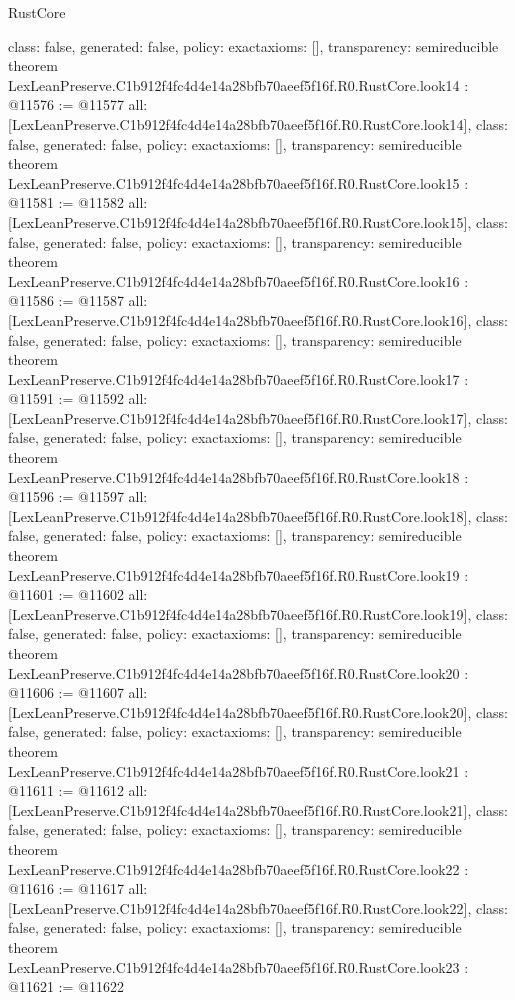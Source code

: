 \begin{lexlean}{RustCore}
\begin{coremodule}
{  class: false,
  generated: false,
  policy: exact{axioms: []},
  transparency: semireducible
}
theorem LexLeanPreserve.C1b912f4fc4d4e14a28bfb70aeef5f16f.R0.RustCore.look14 : @11576 := @11577 {
  all: [LexLeanPreserve.C1b912f4fc4d4e14a28bfb70aeef5f16f.R0.RustCore.look14],
  class: false,
  generated: false,
  policy: exact{axioms: []},
  transparency: semireducible
}
theorem LexLeanPreserve.C1b912f4fc4d4e14a28bfb70aeef5f16f.R0.RustCore.look15 : @11581 := @11582 {
  all: [LexLeanPreserve.C1b912f4fc4d4e14a28bfb70aeef5f16f.R0.RustCore.look15],
  class: false,
  generated: false,
  policy: exact{axioms: []},
  transparency: semireducible
}
theorem LexLeanPreserve.C1b912f4fc4d4e14a28bfb70aeef5f16f.R0.RustCore.look16 : @11586 := @11587 {
  all: [LexLeanPreserve.C1b912f4fc4d4e14a28bfb70aeef5f16f.R0.RustCore.look16],
  class: false,
  generated: false,
  policy: exact{axioms: []},
  transparency: semireducible
}
theorem LexLeanPreserve.C1b912f4fc4d4e14a28bfb70aeef5f16f.R0.RustCore.look17 : @11591 := @11592 {
  all: [LexLeanPreserve.C1b912f4fc4d4e14a28bfb70aeef5f16f.R0.RustCore.look17],
  class: false,
  generated: false,
  policy: exact{axioms: []},
  transparency: semireducible
}
theorem LexLeanPreserve.C1b912f4fc4d4e14a28bfb70aeef5f16f.R0.RustCore.look18 : @11596 := @11597 {
  all: [LexLeanPreserve.C1b912f4fc4d4e14a28bfb70aeef5f16f.R0.RustCore.look18],
  class: false,
  generated: false,
  policy: exact{axioms: []},
  transparency: semireducible
}
theorem LexLeanPreserve.C1b912f4fc4d4e14a28bfb70aeef5f16f.R0.RustCore.look19 : @11601 := @11602 {
  all: [LexLeanPreserve.C1b912f4fc4d4e14a28bfb70aeef5f16f.R0.RustCore.look19],
  class: false,
  generated: false,
  policy: exact{axioms: []},
  transparency: semireducible
}
theorem LexLeanPreserve.C1b912f4fc4d4e14a28bfb70aeef5f16f.R0.RustCore.look20 : @11606 := @11607 {
  all: [LexLeanPreserve.C1b912f4fc4d4e14a28bfb70aeef5f16f.R0.RustCore.look20],
  class: false,
  generated: false,
  policy: exact{axioms: []},
  transparency: semireducible
}
theorem LexLeanPreserve.C1b912f4fc4d4e14a28bfb70aeef5f16f.R0.RustCore.look21 : @11611 := @11612 {
  all: [LexLeanPreserve.C1b912f4fc4d4e14a28bfb70aeef5f16f.R0.RustCore.look21],
  class: false,
  generated: false,
  policy: exact{axioms: []},
  transparency: semireducible
}
theorem LexLeanPreserve.C1b912f4fc4d4e14a28bfb70aeef5f16f.R0.RustCore.look22 : @11616 := @11617 {
  all: [LexLeanPreserve.C1b912f4fc4d4e14a28bfb70aeef5f16f.R0.RustCore.look22],
  class: false,
  generated: false,
  policy: exact{axioms: []},
  transparency: semireducible
}
theorem LexLeanPreserve.C1b912f4fc4d4e14a28bfb70aeef5f16f.R0.RustCore.look23 : @11621 := @11622 {
}
\end{coremodule}
\end{lexlean}
